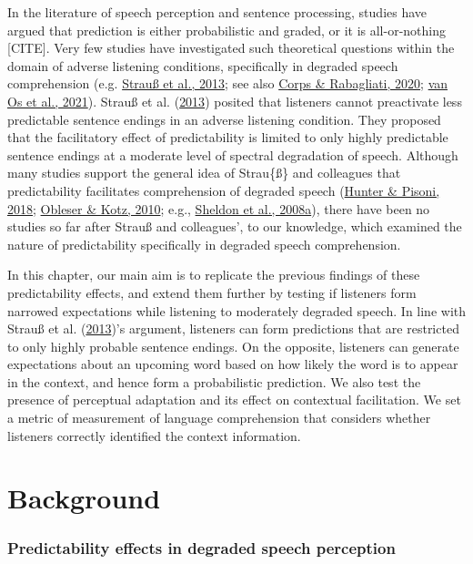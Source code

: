 \documentclass[a4paper, nobind]{templates/ociamthesis}
\begin{document}
In the literature of speech perception and sentence processing, studies have argued that prediction is either probabilistic and graded, or it is all-or-nothing {[}CITE{]}.
Very few studies have investigated such theoretical questions within the domain of adverse listening conditions, specifically in degraded speech comprehension (e.g. \protect\hyperlink{ref-Strauss2013}{Strauß et al., 2013}; see also \protect\hyperlink{ref-Corps2020}{Corps \& Rabagliati, 2020}; \protect\hyperlink{ref-vanOs2021}{van Os et al., 2021}).
Strauß et al. (\protect\hyperlink{ref-Strauss2013}{2013}) posited that listeners cannot preactivate less predictable sentence endings in an adverse listening condition.
They proposed that the facilitatory effect of predictability is limited to only highly predictable sentence endings at a moderate level of spectral degradation of speech.
Although many studies support the general idea of Strau\{\ss\} and colleagues that predictability facilitates comprehension of degraded speech (\protect\hyperlink{ref-Hunter2018}{Hunter \& Pisoni, 2018}; \protect\hyperlink{ref-Obleser2010}{Obleser \& Kotz, 2010}; e.g., \protect\hyperlink{ref-Sheldon2008a}{Sheldon et al., 2008a}),
there have been no studies so far after Strauß and colleagues', to our knowledge, which examined the nature of predictability specifically in degraded speech comprehension.

In this chapter, our main aim is to replicate the previous findings of these predictability effects,
and extend them further by testing if listeners form narrowed expectations while listening to moderately degraded speech.
In line with Strauß et al. (\protect\hyperlink{ref-Strauss2013}{2013})'s argument, listeners can form predictions that are restricted to only highly probable sentence endings.
On the opposite, listeners can generate expectations about an upcoming word based on how likely the word is to appear in the context,
and hence form a probabilistic prediction.
We also test the presence of perceptual adaptation and its effect on contextual facilitation.
We set a metric of measurement of language comprehension that considers whether listeners correctly identified the context information.

\hypertarget{background-1}{%
\section{Background}\label{background-1}}

\hypertarget{predictability-effects-in-degraded-speech-perception}{%
\subsubsection{Predictability effects in degraded speech perception}\label{predictability-effects-in-degraded-speech-perception}}
\end{document}

